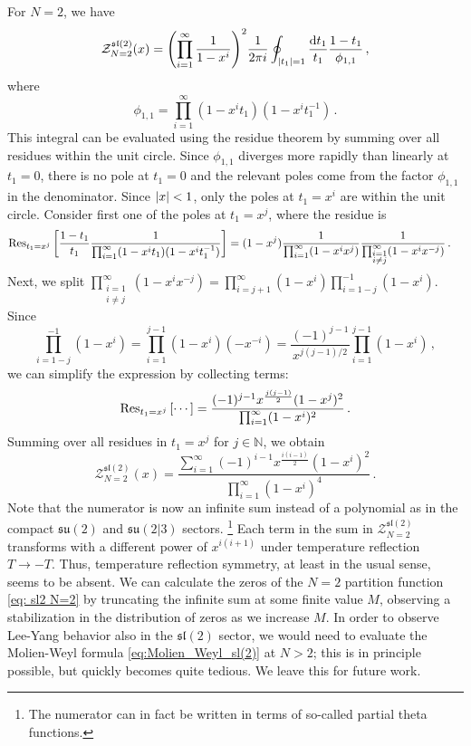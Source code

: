\documentclass[a4paper,11pt]{article}
\begin{document}
For $N=2$, we have
\begin{equation}
	\mathcal{Z}_{N=2}^{\mathfrak{sl}(2)}(x) = \qty(\prod_{i=1}^\infty\frac{1}{1-x^i})^2 \frac{1}{2\pi i} \oint_{|t_1|=1} \frac{\dd t_1}{t_1} \frac{1-t_1}{\phi_{1,1}} \,,
\end{equation}
where 
\begin{equation}
 \phi_{1,1}=\prod_{i=1}^\infty(1-x^it_1)(1-x^it_1^{-1})\,.
\end{equation}
This integral can be evaluated using the residue theorem by summing over all residues within the unit circle. 
Since $\phi_{1,1}$ diverges more rapidly than linearly at $t_1=0$, there is no pole at $t_1=0$ and the relevant poles come from the factor $\phi_{1,1}$ in the denominator.
Since $\abs{x} < 1$, only the poles at $t_1 = x^i$ are within the unit circle. Consider first one of the poles at $t_1 = x^j$, where the residue is
\begin{equation}
\begin{split}
	\Res_{t_1=x^j}\qty[\frac{1-t_1}{t_1}\frac{1}{\prod_{i=1}^\infty(1-x^it_1)(1-x^it_1^{-1})}]
	&= (1-x^j)\frac{1}{\prod_{i=1}^\infty(1-x^ix^j)}\frac{1}{\prod_{\substack{i=1\\i\neq j}}^\infty(1-x^ix^{-j})}
	\,.
\end{split}
\end{equation}
Next, we split $\prod_{\substack{i=1\\i\neq j}}^\infty(1-x^ix^{-j})=\prod_{i=j+1}^\infty(1-x^i)\prod_{i=1-j}^{-1}(1-x^i)$.
Since 
\begin{equation}
\prod_{i=1-j}^{-1}(1-x^i) = \prod_{i=1}^{j-1}(1-x^i)(-x^{-i}) = \frac{(-1)^{j-1}}{x^{j(j-1)/2}}\prod_{i=1}^{j-1}(1-x^i)\,,
\end{equation}
we can simplify the expression by collecting terms:
\begin{equation}
	\Res_{t_1=x^j}\qty[\cdots] = \frac{(-1)^{j-1} x^{\frac{j(j-1)}{2}} (1-x^j)^2}{\prod_{i=1}^\infty(1-x^i)^2}\,.
\end{equation}
Summing over all residues in $t_1=x^j$ for $j\in \mathbb{N}$, we obtain
% 
\begin{equation}
\label{eq: sl2 N=2}
	\mathcal{Z}_{N=2}^{\mathfrak{sl}(2)}(x) = \frac{\sum_{i=1}^\infty (-1)^{i-1} x^{\frac{i(i-1)}{2}}(1-x^i)^2}{\prod_{i=1}^\infty (1-x^i)^4}\,.
\end{equation}
Note that the numerator is now an infinite sum instead of a polynomial as in the compact $\mathfrak{su}(2)$ and $\mathfrak{su}(2|3)$ sectors.%
\footnote{The numerator can in fact be written in terms of so-called partial theta functions.}
Each term in the sum in $\mathcal{Z}_{N=2}^{\mathfrak{sl}(2)}$ transforms with a different power of $x^{i(i+1)}$ under temperature reflection $T\to-T$. Thus, temperature reflection symmetry, at least in the usual sense, seems to be absent.
We can calculate the zeros of the $N=2$ partition function \eqref{eq: sl2 N=2} by truncating the infinite sum at some finite value $M$, observing a stabilization in the distribution of zeros as we increase $M$. 
In order to observe Lee-Yang behavior also in the $\mathfrak{sl}(2)$ sector, we would need to evaluate the Molien-Weyl formula \eqref{eq:Molien_Weyl_sl(2)} at $N>2$; this is in principle possible, but quickly becomes quite tedious.  We leave this for future work.
\end{document}
